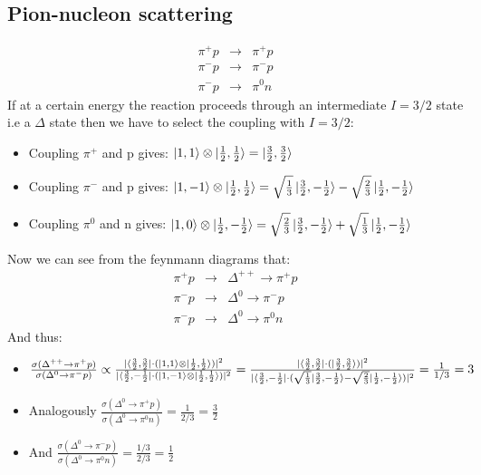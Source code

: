 \documentclass[10pt,a4paper,twoside]{article}
\begin{document}
\subsection{Pion-nucleon scattering}
\begin{eqnarray*}
	\pi^+p &\rightarrow & \pi^+p\\
	\pi^-p &\rightarrow & \pi^-p\\
	\pi^-p &\rightarrow & \pi^0n
\end{eqnarray*}
If at a certain energy the reaction proceeds through an intermediate $I=3/2$ state i.e a $\Delta$ state then we have to select the coupling with $I=3/2$:
\begin{itemize}
	\item Coupling $\pi^+$ and p gives: $\ket{1,1}\otimes\ket{\frac{1}{2},\frac{1}{2}} = \ket{\frac{3}{2},\frac{3}{2}}$
	\item Coupling $\pi^-$ and p gives: $\ket{1,-1}\otimes\ket{\frac{1}{2},\frac{1}{2}} = \sqrt{\frac{1}{3}}\ket{\frac{3}{2},-\frac{1}{2}} - \sqrt{\frac{2}{3}}\ket{\frac{1}{2},-\frac{1}{2}}$
	\item Coupling $\pi^0$ and n gives: $\ket{1,0}\otimes\ket{\frac{1}{2},-\frac{1}{2}} = \sqrt{\frac{2}{3}}\ket{\frac{3}{2},-\frac{1}{2}} + \sqrt{\frac{1}{3}}\ket{\frac{1}{2},-\frac{1}{2}}$
\end{itemize}
Now we can see from the feynmann diagrams that:
\begin{eqnarray*}
	\pi^+p &\rightarrow & \Delta^{++} \rightarrow \pi^+p\\
	\pi^-p &\rightarrow & \Delta^0 \rightarrow \pi^-p\\
	\pi^-p &\rightarrow & \Delta^0 \rightarrow \pi^0n
\end{eqnarray*}
And thus:
\begin{itemize}
	\item $\frac{\sigma(\Delta^{++} \rightarrow \pi^+p)}{\sigma(\Delta^0 \rightarrow \pi^-p)}\propto
	\frac{|\bra{\frac{3}{2},\frac{3}{2}}\cdot(\ket{1,1}\otimes\ket{\frac{1}{2},\frac{1}{2}})|^2}{|\bra{\frac{3}{2},-\frac{1}{2}}\cdot(\ket{1,-1}\otimes\ket{\frac{1}{2},\frac{1}{2}})|^2}
	=\frac{|\bra{\frac{3}{2},\frac{3}{2}}\cdot(\ket{\frac{3}{2},\frac{3}{2}})|^2}{|\bra{\frac{3}{2},-\frac{1}{2}}\cdot(\sqrt{\frac{1}{3}}\ket{\frac{3}{2},-\frac{1}{2}} - \sqrt{\frac{2}{3}}\ket{\frac{1}{2},-\frac{1}{2}})|^2}
	=\frac{1}{1/3} = 3$
	\item Analogously $\frac{\sigma(\Delta^0 \rightarrow \pi^+p)}{\sigma(\Delta^0 \rightarrow \pi^0n)}=\frac{1}{2/3} = \frac{3}{2}$
	\item And $\frac{\sigma(\Delta^0 \rightarrow \pi^-p)}{\sigma(\Delta^0 \rightarrow \pi^0n)}=\frac{1/3}{2/3} = \frac{1}{2}$
\end{itemize}
\end{document}
